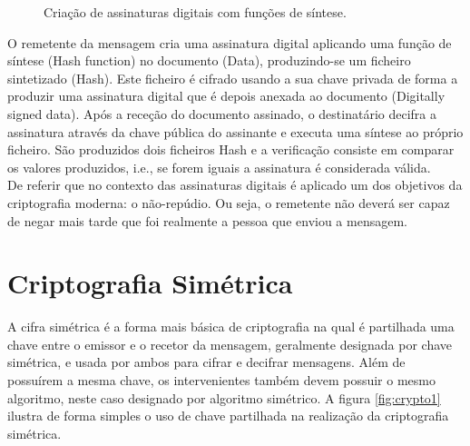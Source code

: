 \documentclass[a4paper,11pt,openright,oneside]{report}
\begin{document}
\begin{figure}[ht]
\center
{}
\caption{Criação de assinaturas digitais com funções de síntese.}
\label{fig:crypto5}
\end{figure}

O remetente da mensagem cria uma assinatura digital aplicando uma função de síntese (Hash function) no documento (Data), produzindo-se um ficheiro sintetizado (Hash). Este ficheiro é cifrado usando a sua chave privada de forma a produzir uma assinatura digital que é depois anexada ao documento (Digitally signed data). Após a receção do documento assinado, o destinatário decifra a assinatura através da chave pública do assinante e executa uma síntese ao próprio ficheiro. São produzidos dois ficheiros Hash e a verificação consiste em comparar os valores produzidos, i.e., se forem iguais a assinatura é considerada válida.\\

De referir que no contexto das assinaturas digitais é aplicado um dos objetivos da criptografia moderna: o não-repúdio. Ou seja, o remetente não deverá ser capaz de negar mais tarde que foi realmente a pessoa que enviou a mensagem.

\section{Criptografia Simétrica}
\label{chalp.simétrica}

A cifra simétrica é a forma mais básica de criptografia na qual é partilhada uma chave entre o emissor e o recetor da mensagem, geralmente designada por chave simétrica, e usada por ambos para cifrar e decifrar mensagens. Além de possuírem a mesma chave, os intervenientes também devem possuir o mesmo algoritmo, neste caso designado por algoritmo simétrico. A figura \ref{fig:crypto1} ilustra de forma simples o uso de chave partilhada na realização da criptografia simétrica.
\end{document}
